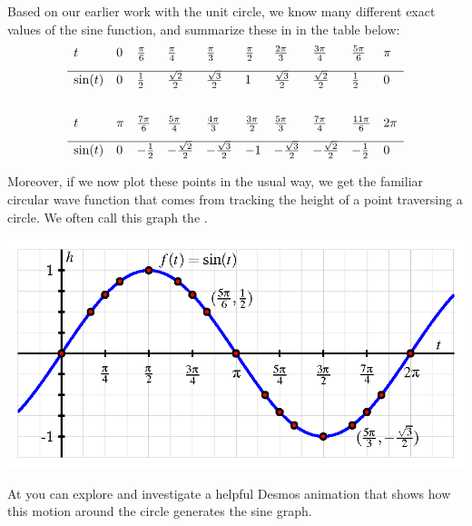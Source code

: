 \documentclass[nooutcomes]{ximera}
\begin{document}
Based on our earlier work with the unit circle, we know many different exact values of the sine function, and summarize these in in the table below:
\[
\begin{array}{llllllllll}
t&0&\frac{\pi}{6}&\frac{\pi}{4}&\frac{\pi}{3}&\frac{\pi}{2}&\frac{2\pi}{3}&\frac{3\pi}{4}&\frac{5\pi}{6}&\pi\\[8pt]
\hline \\[-3ex]
\sin(t)&0&\frac{1}{2}&\frac{\sqrt{2}}{2}&\frac{\sqrt{3}}{2}&1&\frac{\sqrt{3}}{2}&\frac{\sqrt{2}}{2}&\frac{1}{2}&0\\[10pt]
&&&&&&&&&\\
t&\pi&\frac{7\pi}{6}&\frac{5\pi}{4}&\frac{4\pi}{3}&\frac{3\pi}{2}&\frac{5\pi}{3}&\frac{7\pi}{4}&\frac{11\pi}{6}&2\pi\\[8pt]
\hline\\[-3ex]
\sin(t)&0&-\frac{1}{2}&-\frac{\sqrt{2}}{2}&-\frac{\sqrt{3}}{2}&-1&-\frac{\sqrt{3}}{2}&-\frac{\sqrt{2}}{2}&-\frac{1}{2}&0
\end{array}
\]

Moreover, if we now plot these points in the usual way, we get the familiar circular wave function that comes from tracking the height of a point traversing a circle.  We often call this graph the .

\begin{image}
\includegraphics{sine-definition-graph.png}
\end{image}

At  you can explore and investigate a helpful Desmos animation that shows how this motion around the circle generates the sine graph.
\end{document}
